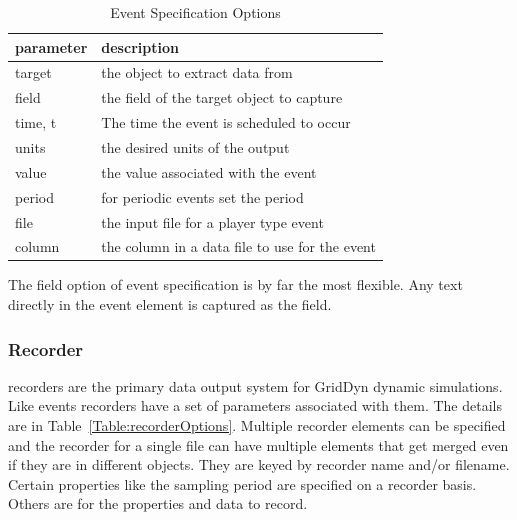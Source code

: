 \documentclass[12pt]{article} %
\begin{document}
  \begin{table}[ht]
  	
  	\caption{Event Specification Options} %
  	\centering %
  	\begin{tabular}{l p{14cm}} %
  		\hline %
  		parameter &  description \\ [0.5ex] %
  		\hline %
  	
  	
  		target  &  the object to extract data from\\
  		field &  the field of the target object to capture \\
  		time, t & The time the event is scheduled to occur \\
  		units  & the desired units of the output \\%
		value & the value associated with the event \\
  		period  &  for periodic events set the period\\
  			file &  the input file for a player type event\\ %
  			column & the column in a data file to use for the event \\
  		\hline %
  	\end{tabular}
  	\label{Table:eventOptions}
  \end{table} 
 
 The field option of event specification is by far the most flexible.  Any text directly in the event element is captured as the field.  
 \subsubsection{Recorder}
 recorders are the primary data output system for GridDyn dynamic simulations.  Like events recorders have a set of parameters associated with them.  The details are in Table~\ref{Table:recorderOptions}.  Multiple recorder elements can be specified and the recorder for a single file can have multiple elements that get merged even if they are in different objects.  They are keyed by recorder name and/or filename.  Certain properties like the sampling period are specified on a recorder basis.  Others are for the properties and data to record.  
\end{document}
